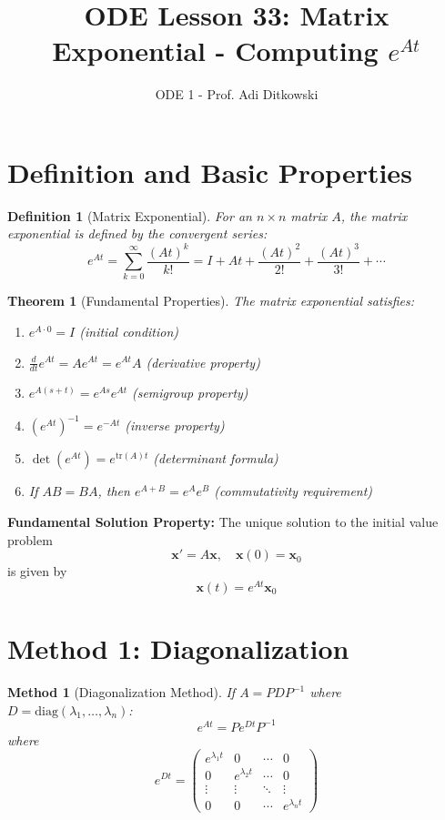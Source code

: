 \documentclass[12pt]{article}
\title{ODE Lesson 33: Matrix Exponential - Computing $e^{At}$}
\author{ODE 1 - Prof. Adi Ditkowski}
\date{}
\newtheorem{definition}{Definition}
\newtheorem{theorem}{Theorem}
\newtheorem{method}{Method}
\begin{document}
\maketitle

\section{Definition and Basic Properties}

\begin{definition}[Matrix Exponential]
For an $n \times n$ matrix $A$, the matrix exponential is defined by the convergent series:
\[e^{At} = \sum_{k=0}^{\infty} \frac{(At)^{k}}{k!} = I + At + \frac{(At)^{2}}{2!} + \frac{(At)^{3}}{3!} + \cdots\]
\end{definition}

\begin{theorem}[Fundamental Properties]
The matrix exponential satisfies:
\begin{enumerate}
\item $e^{A \cdot 0} = I$ (initial condition)
\item $\frac{d}{dt}e^{At} = Ae^{At} = e^{At}A$ (derivative property)
\item $e^{A(s+t)} = e^{As}e^{At}$ (semigroup property)
\item $(e^{At})^{-1} = e^{-At}$ (inverse property)
\item $\det(e^{At}) = e^{\text{tr}(A)t}$ (determinant formula)
\item If $AB = BA$, then $e^{A+B} = e^{A}e^{B}$ (commutativity requirement)
\end{enumerate}
\end{theorem}

\begin{matexp}
\textbf{Fundamental Solution Property:}
The unique solution to the initial value problem
\[\mathbf{x}' = A\mathbf{x}, \quad \mathbf{x}(0) = \mathbf{x}_{0}\]
is given by
\[\mathbf{x}(t) = e^{At}\mathbf{x}_{0}\]
\end{matexp}

\section{Method 1: Diagonalization}

\begin{method}[Diagonalization Method]
If $A = PDP^{-1}$ where $D = \text{diag}(\lambda_{1}, \ldots, \lambda_{n})$:
\[e^{At} = Pe^{Dt}P^{-1}\]
where
\[e^{Dt} = \begin{pmatrix}
e^{\lambda_{1} t} & 0 & \cdots & 0 \\
0 & e^{\lambda_{2} t} & \cdots & 0 \\
\vdots & \vdots & \ddots & \vdots \\
0 & 0 & \cdots & e^{\lambda_{n} t}
\end{pmatrix}\]
\end{method}
\end{document}
